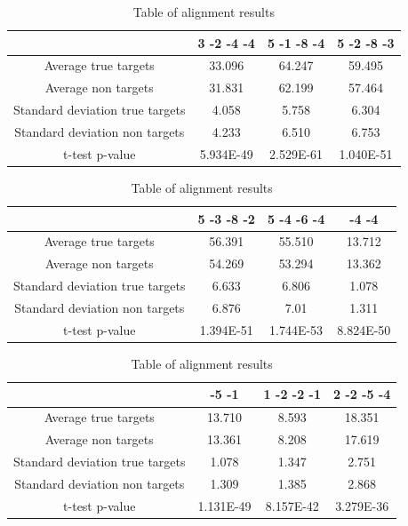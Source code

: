 \documentclass[12pt]{article}
\begin{document}
\begin{table}
\centering
\footnotesize
\caption{Table of alignment results}
\vspace{0.3cm}
\begin{tabular}{c|c|c|c}
& 3 -2 -4 -4 & 5 -1 -8 -4 & 5 -2 -8 -3 \\
\hline\hline
Average true targets & 33.096 & 64.247 & 59.495	\\
Average	non targets & 31.831 & 62.199 & 57.464 \\
\hline
Standard deviation true targets & 4.058	& 5.758 & 6.304\\
Standard deviation non targets & 4.233 & 6.510 & 6.753 \\
\hline
t-test p-value & 5.934E-49 & 2.529E-61 & 1.040E-51 \\\hline
\end{tabular}\vspace{0.5cm}

\begin{tabular}{c|c|c|c}
& 5 -3 -8 -2 & 5 -4 -6 -4 & -4 -4 \\
\hline\hline
Average true targets & 56.391 & 55.510 & 13.712 \\
Average	non targets & 54.269 & 53.294 & 13.362\\
\hline
Standard deviation true targets & 6.633 & 6.806 & 1.078\\
Standard deviation non targets & 6.876 & 7.01 & 1.311\\
\hline
t-test p-value & 1.394E-51 & 1.744E-53 & 8.824E-50 \\\hline
\end{tabular}\vspace{0.5cm}


\begin{tabular}{c|c|c|c}
 & -5 -1 & 1 -2 -2 -1 & 2 -2 -5 -4  \\
\hline\hline
Average true targets & 13.710 & 8.593 & 18.351\\
Average	non targets  & 13.361 &	8.208 &	17.619 \\
\hline
Standard deviation true targets & 1.078	& 1.347	& 2.751\\
Standard deviation non targets & 1.309 & 1.385 & 2.868\\
\hline
t-test p-value & 1.131E-49 & 8.157E-42 & 3.279E-36 \\
\hline
\end{tabular}
\label{table:results}
\end{table}
\end{document}
